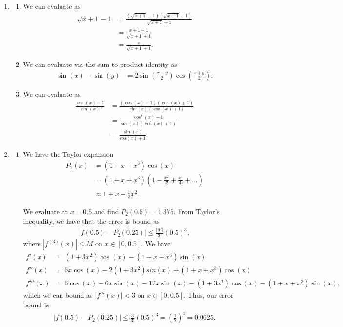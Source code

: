 \documentclass[10pt]{article}
\begin{document}
\begin{enumerate}
\begin{enumerate}
    \end{enumerate}
    \item \begin{enumerate}
        \item We can evaluate as \begin{align*}
            \sqrt{x+1}-1 &= \frac{(\sqrt{x+1}-1)(\sqrt{x+1}+1)}{\sqrt{x+1}+1} \\
            &= \frac{x+1 -1}{\sqrt{x+1}+1} \\
            &= \frac{x}{\sqrt{x+1}+1}.
        \end{align*}
        \item We can evaluate via the sum to product identity as \begin{align*}
            \sin(x) - \sin(y) &= 2\sin \left(\frac{x-y}{2}\right)\cos  \left( \frac{x+y}{2} \right).
        \end{align*}
        \item We can evaluate as \begin{align*}
            \frac{\cos \left( x \right)-1}{\sin  \left( x \right)} &= \frac{(\cos \left( x \right)-1)(\cos  \left( x \right) + 1)}{\sin  \left( x \right)(\cos  (x) + 1)} \\
            &= \frac{\cos ^2(x) - 1}{\sin  \left( x \right)(\cos  (x) + 1)} \\
            &= \frac{\sin  (x)}{cos(x) + 1}.
        \end{align*}
    \end{enumerate}
    \item \begin{enumerate}
        \item We have the Taylor expansion \begin{align*}
            P_2(x) &= (1 + x + x^3)\cos(x) \\
            &= (1 + x + x^3)\left( 1 - \frac{x^2}{2!} + \frac{x^4}{4!} + \dots \right) \\
            &\approx 1 + x - \frac{1}{2}x^2.
        \end{align*}

        We evaluate at \(x=0.5\) and find \(P_2(0.5) = 1.375\). From Taylor's inequality, we have that the error is bound as \begin{align*}
            |f(0.5) - P_2(0.25)| \leq \frac{|M|}{3!}(0.5)^3,
        \end{align*} where \(|f^{(3)}(x)| \leq M\) on \(x \in [0, 0.5]\). We have \begin{align*}
            f'(x) &= (1+3x^2)\cos(x) - (1+x+x^3)\sin  (x) \\
            f''(x) &= 6x\cos(x) - 2(1+3x^2)sin(x) + (1+x+x^3)\cos  (x) \\
            f'''(x) &= 6\cos(x) -6x\sin(x) - 12x\sin(x) -(1+3x^2)\cos(x) - (1+x+x^3)\sin  (x),
        \end{align*}
        which we can bound as \(|f'''(x)| < 3\) on \(x\in[0, 0.5]\). Thus, our error bound is \begin{align*}
            |f(0.5) - P_2(0.25)| \leq \frac{3}{3!}(0.5)^3 = \left(\frac{1}{2}\right)^4 = 0.0625.
        \end{align*}


\end{enumerate}
\end{enumerate}
\end{document}
